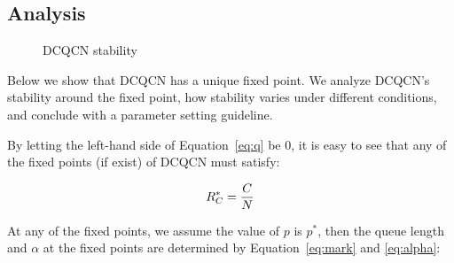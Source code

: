 \subsection{Analysis}

\begin{figure}[t]
\caption{DCQCN stability}
\label{fig:dcqcn_stability}
\end{figure}

Below we show that DCQCN has a unique fixed point. We analyze DCQCN's stability around the 
fixed point, how stability varies under different conditions, and conclude with a 
parameter setting guideline.


 By letting the left-hand side of Equation~\ref{eq:q}
be 0, it is easy to see that any of the fixed points (if exist) of DCQCN must satisfy:

\begin{equation}
\small
{R_C^*} = \frac{C}{N}
\end{equation}

At any of the fixed points, we assume the value of $p$ is $p^*$, then the queue length and
$\alpha$ at the fixed points are determined by Equation~\ref{eq:mark} and \ref{eq:alpha}:

